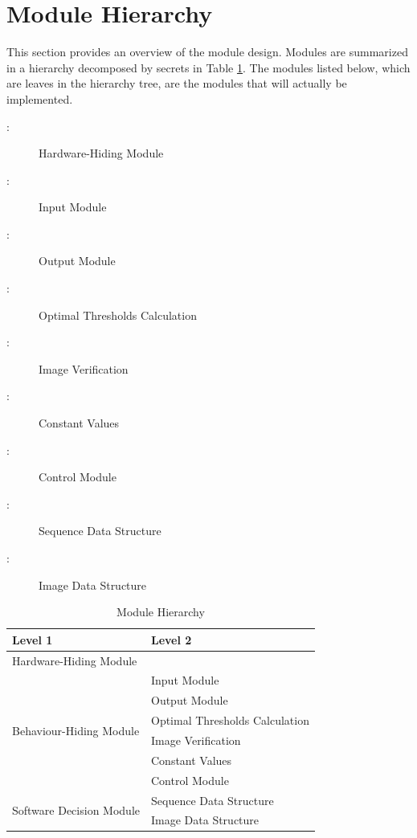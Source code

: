 \documentclass[12pt, titlepage]{article}
\begin{document}
\section{Module Hierarchy} \label{SecMH}

This section provides an overview of the module design. Modules are summarized
in a hierarchy decomposed by secrets in Table \ref{TblMH}. The modules listed
below, which are leaves in the hierarchy tree, are the modules that will
actually be implemented.

\begin{description}
\item [ \mthemnum \label{mHH}:] Hardware-Hiding Module
\item [ \mthemnum \label{mInput}:]
Input Module
\item [ \mthemnum \label{mOutput}:]
Output Module
\item [ \mthemnum \label{mCalculation}:]
Optimal Thresholds Calculation
\item [ \mthemnum \label{mVerify}:]
Image Verification
\item [ \mthemnum \label{mConstants}:]
Constant Values
\item [ \mthemnum \label{mControl}:]
Control Module
\item [ \mthemnum \label{mSequenceDS}:]
Sequence Data Structure
\item [ \mthemnum \label{mImageDS}:]
Image Data Structure
\end{description}


\begin{table}[h!]
\centering
\begin{tabular}{p{} p{}}
\toprule
\textbf{Level 1} & \textbf{Level 2}\\
\midrule

{Hardware-Hiding Module} & ~ \\
\midrule

\multirow{6}{0.3\textwidth}{Behaviour-Hiding Module}
& Input Module\\
& Output Module\\
& Optimal Thresholds Calculation\\
& Image Verification\\
& Constant Values\\
& Control Module\\
\midrule

\multirow{2}{0.3\textwidth}{Software Decision Module}
& Sequence Data Structure\\
& Image Data Structure\\
\bottomrule

\end{tabular}
\caption{Module Hierarchy}
\label{TblMH}
\end{table}
\end{document}
